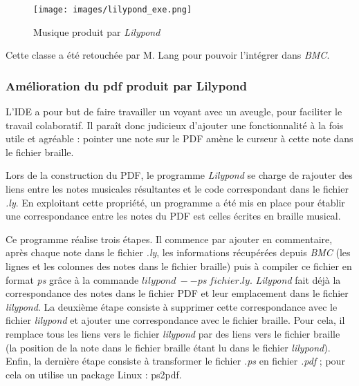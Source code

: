 \begin{figure}[!h]
  \centering
  \texttt{[image: images/lilypond\_exe.png]}
  \caption{Musique produit par \textit{Lilypond}}
  \label{resultatlilypond}
\end{figure}


Cette classe a été retouchée par M. Lang pour pouvoir l'intégrer dans \textit{BMC}.




\subsubsection{Amélioration du pdf produit par Lilypond}

L'IDE a pour but de faire travailler un voyant avec un aveugle,
pour faciliter le travail colaboratif. Il paraît donc judicieux d'ajouter
une fonctionnalité à la fois utile et agréable : pointer une
note sur le PDF amène le curseur à cette note dans le fichier
braille.



Lors de la construction du PDF, le programme \textit{Lilypond} se
charge de rajouter des liens entre les notes musicales résultantes et
le code correspondant dans le fichier \textit{.ly}.  En exploitant
cette propriété, un programme a été mis en place pour établir une
correspondance entre les notes du PDF est celles écrites en braille
musical.  

Ce programme réalise trois étapes. Il commence par ajouter en
commentaire, après chaque note dans le fichier \textit{.ly}, les
informations récupérées depuis \textit{BMC} (les lignes et les colonnes des
notes dans le fichier braille) puis à compiler ce fichier en
format \textit{ps} grâce à la commande $lilypond\ --ps\
fichier.ly$. \textit{Lilypond} fait déjà la correspondance des notes
dans le fichier PDF et leur emplacement dans le fichier \textit{lilypond}.  La
deuxième étape consiste à supprimer cette correspondance avec le
fichier \textit{lilypond} et ajouter une correspondance avec le fichier
braille. Pour cela, il remplace tous les liens vers le
fichier \textit{lilypond} par des liens vers le fichier braille (la
position de la note dans le fichier braille étant lu dans le fichier
\textit{lilypond}). Enfin, la dernière étape consiste à transformer le
fichier \textit{.ps} en fichier \textit{.pdf} ; pour cela on utilise un
package Linux : ps2pdf.

